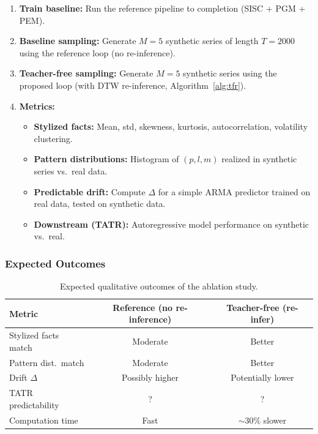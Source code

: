 \begin{enumerate}[leftmargin=*,topsep=2pt,itemsep=2pt]
  \item \textbf{Train baseline:} Run the reference pipeline to completion (SISC + PGM + PEM).
  \item \textbf{Baseline sampling:} Generate $M = 5$ synthetic series of length $T = 2000$ using the reference loop (no re-inference).
  \item \textbf{Teacher-free sampling:} Generate $M = 5$ synthetic series using the proposed loop (with DTW re-inference, Algorithm~\ref{alg:tfr}).
  \item \textbf{Metrics:}
  \begin{itemize}[leftmargin=*,topsep=2pt,itemsep=2pt]
    \item \textbf{Stylized facts:} Mean, std, skewness, kurtosis, autocorrelation, volatility clustering.
    \item \textbf{Pattern distributions:} Histogram of $(p, l, m)$ realized in synthetic series vs.\ real data.
    \item \textbf{Predictable drift:} Compute $\Delta$ for a simple ARMA predictor trained on real data, tested on synthetic data.
    \item \textbf{Downstream (TATR):} Autoregressive model performance on synthetic vs.\ real.
  \end{itemize}
\end{enumerate}

\subsubsection{Expected Outcomes}

\begin{table}[h]
\centering
\small
\begin{tabular}{lcc}
\toprule
\textbf{Metric} & \textbf{Reference (no re-inference)} & \textbf{Teacher-free (re-infer)} \\
\midrule
Stylized facts match & Moderate & Better \\
Pattern dist.\ match & Moderate & Better \\
Drift $\Delta$ & Possibly higher & Potentially lower \\
TATR predictability & ? & ? \\
Computation time & Fast & $\sim 30\%$ slower \\
\bottomrule
\end{tabular}
\caption{Expected qualitative outcomes of the ablation study.}
\label{tab:ablation-outcomes}
\end{table}

